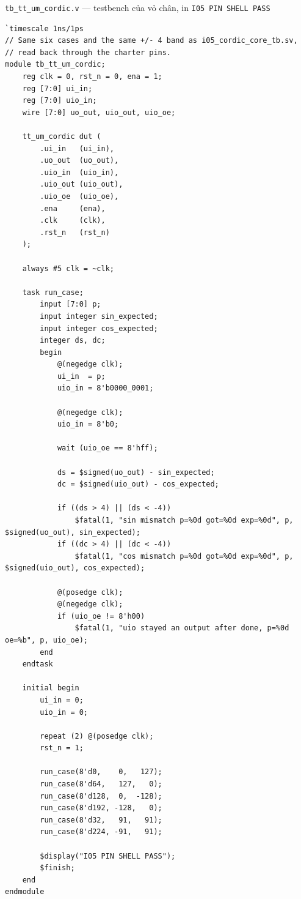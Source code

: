 \documentclass[12pt,a4paper]{article}
\begin{document}
\noindent\texttt{tb\_tt\_um\_cordic.v} — testbench của vỏ chân, in \texttt{I05 PIN SHELL PASS}

\begin{verbatim}
`timescale 1ns/1ps
// Same six cases and the same +/- 4 band as i05_cordic_core_tb.sv,
// read back through the charter pins.
module tb_tt_um_cordic;
    reg clk = 0, rst_n = 0, ena = 1;
    reg [7:0] ui_in;
    reg [7:0] uio_in;
    wire [7:0] uo_out, uio_out, uio_oe;

    tt_um_cordic dut (
        .ui_in   (ui_in),
        .uo_out  (uo_out),
        .uio_in  (uio_in),
        .uio_out (uio_out),
        .uio_oe  (uio_oe),
        .ena     (ena),
        .clk     (clk),
        .rst_n   (rst_n)
    );

    always #5 clk = ~clk;

    task run_case;
        input [7:0] p;
        input integer sin_expected;
        input integer cos_expected;
        integer ds, dc;
        begin
            @(negedge clk);
            ui_in  = p;
            uio_in = 8'b0000_0001;

            @(negedge clk);
            uio_in = 8'b0;

            wait (uio_oe == 8'hff);

            ds = $signed(uo_out) - sin_expected;
            dc = $signed(uio_out) - cos_expected;

            if ((ds > 4) || (ds < -4))
                $fatal(1, "sin mismatch p=%0d got=%0d exp=%0d", p, $signed(uo_out), sin_expected);
            if ((dc > 4) || (dc < -4))
                $fatal(1, "cos mismatch p=%0d got=%0d exp=%0d", p, $signed(uio_out), cos_expected);

            @(posedge clk);
            @(negedge clk);
            if (uio_oe != 8'h00)
                $fatal(1, "uio stayed an output after done, p=%0d oe=%b", p, uio_oe);
        end
    endtask

    initial begin
        ui_in = 0;
        uio_in = 0;

        repeat (2) @(posedge clk);
        rst_n = 1;

        run_case(8'd0,    0,   127);
        run_case(8'd64,   127,   0);
        run_case(8'd128,  0,  -128);
        run_case(8'd192, -128,   0);
        run_case(8'd32,   91,   91);
        run_case(8'd224, -91,   91);

        $display("I05 PIN SHELL PASS");
        $finish;
    end
endmodule
\end{verbatim}
\end{document}
